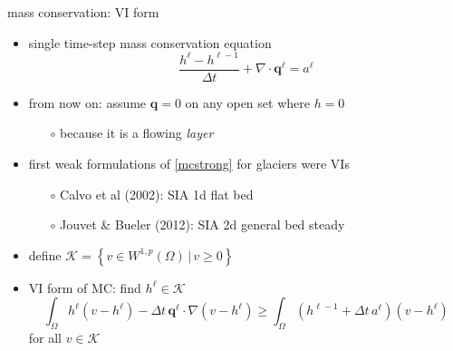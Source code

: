 \documentclass[xcolor={dvipsnames}]{beamer}
\newcommand\bq{\mathbf{q}}
\newcommand\Div{\nabla\cdot}
\newcommand\grad{\nabla}
\begin{document}
\begin{frame}{mass conservation: VI form}

\begin{itemize}
\item single time-step mass conservation equation
\begin{equation}
\frac{h^\ell - h^{\ell-1}}{\Delta t} + \Div \bq^\ell = a^\ell \tag{MC} \label{mcstrong}
\end{equation}
\item from now on: assume $\bq=0$ on any open set where $h=0$
    \begin{itemize}
    \item[$\circ$] because it is a flowing \emph{layer}
    \end{itemize}
\item first weak formulations of \ref{mcstrong} for glaciers were VIs
    \begin{itemize}
    \item[$\circ$] Calvo et al (2002): SIA 1d flat bed
    \item[$\circ$] Jouvet \& Bueler (2012): SIA 2d general bed steady
    \end{itemize}
\item define $\mathcal{K} = \left\{v \in W^{1,p}(\Omega) \,\Big|\, v\ge 0\right\}$
\item VI form of MC: find $h^\ell\in\mathcal{K}$
    $$\int_\Omega h^\ell (v - h^\ell) - \Delta t\, \bq^\ell \cdot \grad(v - h^\ell) \ge \int_\Omega \left(h^{\ell-1} + \Delta t\, a^\ell\right) (v - h^\ell)$$
for all $v \in \mathcal{K}$
\end{itemize}
\end{frame}
\end{document}
